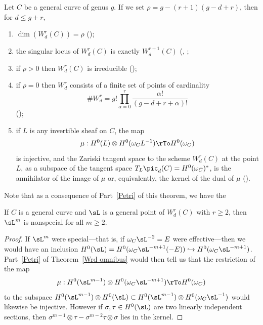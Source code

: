 \begin{theorem}\label{Wrd omnibus}
Let $C$ be a general curve of genus $g$. If we set $\rho = g - (r+1)(g-d+r)$, then for $d \leq g+r$,
\begin{enumerate}

\item $\dim(W^r_d(C)) = \rho$ (\cite{Griffiths-Harris-BN});

\item\label{sing wrd} the singular locus of $W^r_d(C)$ is exactly $W^{r+1}_d(C)$
(\cite{Gieseker-Petri}, \cite{Lazarsfeld-Petri};
\label{irr wrd} 

\item if $\rho > 0$ then $W^r_d(C)$ is irreducible (\cite{MR611386});

\item\label{rho=0} if $\rho = 0$ then $W^r_d$ consists of a finite set of  points of cardinality
$$
\#W^r_d = g! \prod_{\alpha=0}^r \frac{\alpha!}{(g-d+r+\alpha)!}
$$
(\cite{MR323792});

\item\label{Petri} if $L$ is any invertible sheaf on $C$, the map
$$
\mu : H^0(L) \otimes H^0(\omega_CL^{-1}) \rTo H^0(\omega_C)
$$
is injective, and the Zariski tangent space to the scheme $W^r_d(C)$ at the point $L$, as a subspace
of the tangent space $T_L\pic_d(C) = H^0(\omega_C)^*$, is the annihilator of the image of $\mu$
or, equivalently, the kernel of the dual of $\mu$ (\cite{Gieseker-Petri}).
\end{enumerate}
\end{theorem}

Note that as a consequence of Part~\ref{Petri} of this theorem, we have the

\begin{corollary}\label{2L nonspecial}
If $C$ is a general curve and $\sL$ is a general point of $W^r_d(C)$ with $r\geq 2$,
 then $\sL^m$ is nonspecial for all $m \geq 2$.
\end{corollary}

\begin{proof}
If $\sL^m$ were special---that is, if $\omega_C\sL^{-2} = E$ were effective---then we would have an inclusion $H^0(\sL) = H^0(\omega_C\sL^{-m+1}(-E)) \hookrightarrow H^0(\omega_C\sL^{-m+1})$. Part~\ref{Petri} of Theorem~\ref{Wrd omnibus} would then tell us that the restriction of the map 
 $$
\mu : H^0(\sL^{m-1}) \otimes H^0(\omega_C\sL^{-m+1}) \rTo H^0(\omega_C)
$$
to the subspace $H^0(\sL^{m-1}) \otimes H^0(\sL) \subset H^0(\sL^{m-1}) \otimes H^0(\omega_C\sL^{-1})$ would likewise be injective.
However if $\sigma, \tau \in H^0(\sL)$ are two linearly independent sections, then $\sigma^{m-1} \otimes \tau - \sigma^{m-2}\tau \otimes \sigma$ lies in the kernel.
\end{proof}

